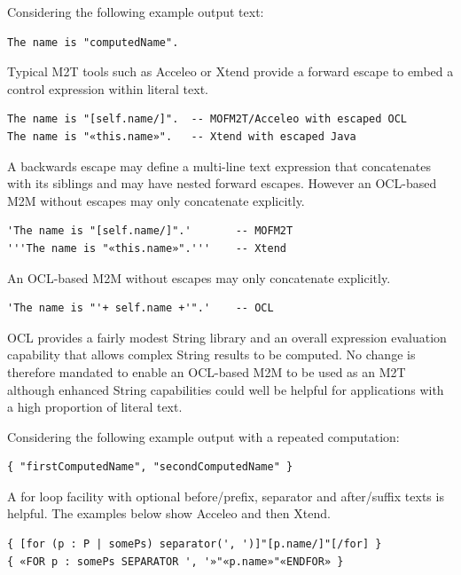 \documentclass{llncs}
\begin{document}
Considering the following example output text:

\begin{verbatim}
The name is "computedName".
\end{verbatim}

Typical M2T tools such as Acceleo or Xtend provide a forward escape to embed a control expression within literal text. 

\begin{verbatim}
The name is "[self.name/]".  -- MOFM2T/Acceleo with escaped OCL
The name is "«this.name»".   -- Xtend with escaped Java
\end{verbatim}

A backwards escape may define a multi-line text expression that concatenates with its siblings and may have nested forward escapes. However an OCL-based M2M without escapes may only concatenate explicitly.

\begin{verbatim}
'The name is "[self.name/]".'       -- MOFM2T
'''The name is "«this.name»".'''    -- Xtend
\end{verbatim}

An OCL-based M2M without escapes may only concatenate explicitly.

\begin{verbatim}
'The name is "'+ self.name +'".'    -- OCL
\end{verbatim}

OCL provides a fairly modest String library and an overall expression evaluation capability that allows complex String results to be computed. No change is therefore mandated to enable an OCL-based M2M to be used as an M2T although enhanced String capabilities could well be helpful for applications with a high proportion of literal text.

Considering the following example output with a repeated computation:

\begin{verbatim}
{ "firstComputedName", "secondComputedName" }
\end{verbatim}

A for loop facility with optional before/prefix, separator and after/suffix texts is helpful. The examples below show Acceleo and then Xtend.

\begin{verbatim}
{ [for (p : P | somePs) separator(', ')]"[p.name/]"[/for] }
{ «FOR p : somePs SEPARATOR ', '»"«p.name»"«ENDFOR» } 
\end{verbatim}
\end{document}
